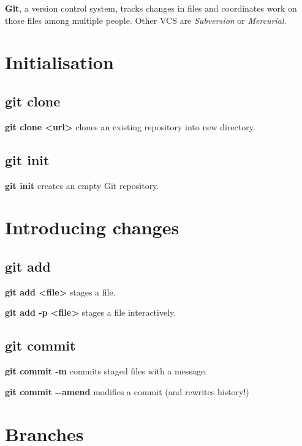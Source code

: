 \documentclass[a4paper, twoside, 8pt]{extarticle}
\begin{document}
\renewcommand{\footrulewidth}{0.4pt}

\begin{multicols*}{3}
\textbf{Git}, a version control system, tracks changes in files and coordinates work on those files among multiple people.
Other VCS are \emph{Subversion} or \emph{Mercurial}.

\section*{Initialisation} %
\subsection*{\dotfill git clone}
\textbf{git clone <url>} clones an existing repository into new directory.

\subsection*{\dotfill git init}
\textbf{git init} creates an empty Git repository.

\section*{Introducing changes} %
\subsection*{\dotfill git add}
\textbf{git add <file>} stages a file.

\textbf{git add -p <file>} stages a file interactively.

\subsection*{\dotfill git commit}
\textbf{git commit -m} commits staged files with a message.

\textbf{git commit -{}-amend} modifies a commit (and rewrites history!)

\section*{Branches}

\end{multicols*}
\end{document}
